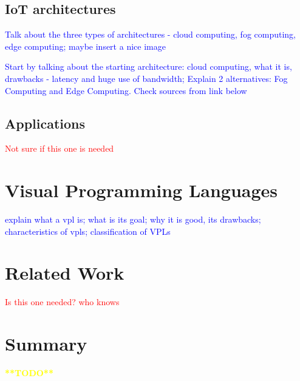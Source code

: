 \subsection{IoT architectures}\label{sec:architectures}

\textcolor{blue}{Talk about the three types of architectures - cloud computing, fog computing, edge computing; maybe insert a nice image}

\textcolor{blue}{Start by talking about the starting architecture: cloud computing, what it is, drawbacks - latency and huge use of bandwidth; Explain 2 alternatives: Fog Computing and Edge Computing. Check sources from link below}


\subsection{Applications}\label{sec:iot_applications}

\textcolor{red}{Not sure if this one is needed}

\section{Visual Programming Languages}\label{sec:background_vpl}

\textcolor{blue}{explain what a vpl is; what is its goal; why it is good, its drawbacks; characteristics of vpls; classification of VPLs}

\section{Related Work}

\textcolor{red}{Is this one needed? who knows}

\section{Summary}

\textcolor{yellow}{\textbf{**TODO**}}
